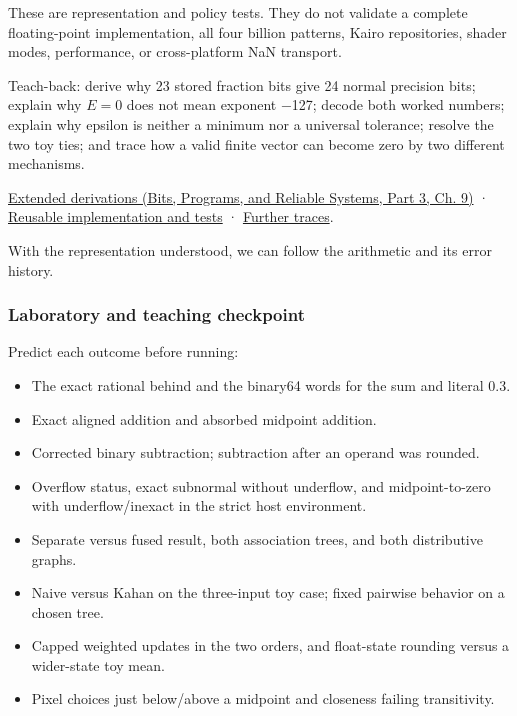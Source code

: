 These are representation and policy tests. They do not validate a complete floating-point implementation, all four billion patterns, Kairo repositories, shader modes, performance, or cross-platform NaN transport.

Teach-back: derive why 23 stored fraction bits give 24 normal precision bits; explain why \(E=0\) does not mean exponent −127; decode both worked numbers; explain why epsilon is neither a minimum nor a universal tolerance; resolve the two toy ties; and trace how a valid finite vector can become zero by two different mechanisms.

\href{../01-Bits-Programs-and-Reliable-Systems-P03/main.pdf\#01-foundations-i-ch011-m004---floating-point-fields-spacing-and-rounding}{Extended derivations (Bits, Programs, and Reliable Systems, Part 3, Ch. 9)} · \hyperref[appendix-4e2236f53445-m004---binary-interchange-inspection-and-strict-rounding-laboratory]{Reusable implementation and tests} · \hyperref[appendix-92ff77d4dfdc-m004---from-fields-to-values-and-failure-paths]{Further traces}.

With the representation understood, we can follow the arithmetic and its error history.

\subsubsection{Laboratory and teaching checkpoint}\label{05-engine-i-ch001-laboratory-and-teaching-checkpoint}

\hypertarget{05-engine-i-ch001-laboratory-and-teaching-checkpoint}{}

Predict each outcome before running:

\begin{itemize}
\tightlist
\item
  The exact rational behind  and the binary64 words for the sum and literal 0.3.
\item
  Exact aligned addition and absorbed midpoint addition.
\item
  Corrected binary subtraction; subtraction after an operand was rounded.
\item
  Overflow status, exact subnormal without underflow, and midpoint-to-zero with underflow/inexact in the strict host environment.
\item
  Separate versus fused result, both association trees, and both distributive graphs.
\item
  Naive versus Kahan on the three-input toy case; fixed pairwise behavior on a chosen tree.
\item
  Capped weighted updates in the two orders, and float-state rounding versus a wider-state toy mean.
\item
  Pixel choices just below/above a midpoint and closeness failing transitivity.
\end{itemize}


